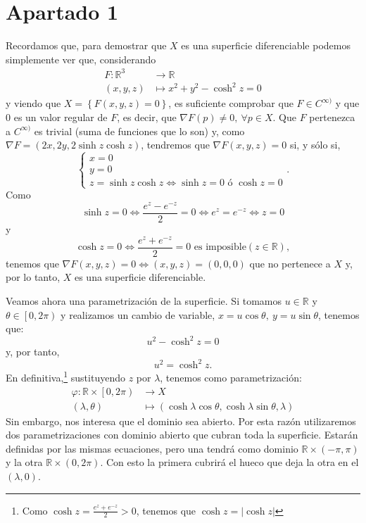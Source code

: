 \section{Apartado 1}
Recordamos que, para demostrar que $X$ es una superficie diferenciable podemos
simplemente ver que, considerando
\begin{align*}
    F: \mathbb{R}^3 &\rightarrow \mathbb{R}\\
    \left( x, y, z \right) &\mapsto x^2 + y^2 - \cosh^2z = 0
\end{align*}
y viendo que $X = \left\{ F\left( x, y, z \right) = 0 \right\}$, es suficiente
comprobar que $F \in C^{\infty)}$ y que $0$ es un valor regular de $F$, es
decir, que $\nabla F\left( p \right) \neq 0,\ \forall p \in X$. Que $F$
pertenezca a $C^{\infty)}$ es trivial (suma de funciones que lo son) y, como
$\nabla F = \left( 2x, 2y, 2\sinh z \cosh z \right)$, tendremos que $\nabla
F\left( x, y, z \right) = 0$ si, y sólo si,
\[
    \begin{cases}
        x = 0\\
        y = 0\\
        z = \sinh z \cosh z \Leftrightarrow \sinh z = 0 \text{ ó } \cosh z = 0
    \end{cases}.
\]
Como 
\[
\sinh z = 0 \Leftrightarrow \frac{e^z - e^{-z}}{2} = 0 \Leftrightarrow e^z =
e^{-z} \Leftrightarrow z = 0
\]
y
\[
\cosh z = 0 \Leftrightarrow \frac{e^z + e^{-z}}{2} = 0 \text{ es imposible}
\left( z \in \mathbb{R} \right),
\]
tenemos que $\nabla F\left( x, y, z \right) = 0 \Leftrightarrow \left( x, y, z
\right) = \left( 0, 0, 0 \right)$ que no pertenece a $X$ y, por lo tanto, $X$ es una superficie
diferenciable.

Veamos ahora una parametrización de la superficie. Si tomamos $u \in \mathbb{R}$
y $\theta \in \left[ 0, 2 \pi \right)$ y realizamos un cambio de variable, $x =
u \cos \theta,\ y = u \sin \theta$, tenemos que:
\[
u^2 - \cosh^2 z = 0
\]
y, por tanto,
\[
u^2 = \cosh^2 z.
\]
En definitiva,\footnote{Como $\cosh z = \frac{e^z + e^{-z}}{2} > 0$, tenemos que
$\cosh z = \left\lvert \cosh z \right\rvert$} sustituyendo $z$ por $\lambda$,
tenemos como parametrización: 
\begin{align*}
    \varphi: \mathbb{R} \times \left[ 0, 2 \pi \right) &\rightarrow X\\
    \left( \lambda, \theta \right) &\mapsto \left( \cosh \lambda \cos \theta, \cosh
    \lambda \sin \theta, \lambda \right)
\end{align*}
Sin embargo, nos interesa que el dominio sea abierto. Por esta razón
utilizaremos dos parametrizaciones con dominio abierto que cubran toda la
superficie. Estarán definidas por las mismas ecuaciones, pero una tendrá como
dominio $\mathbb{R} \times \left( -\pi, \pi \right)$ y la otra $\mathbb{R}
\times \left( 0, 2 \pi \right) $. Con esto la primera cubrirá el hueco que deja
la otra en el $\left( \lambda, 0 \right)$.

